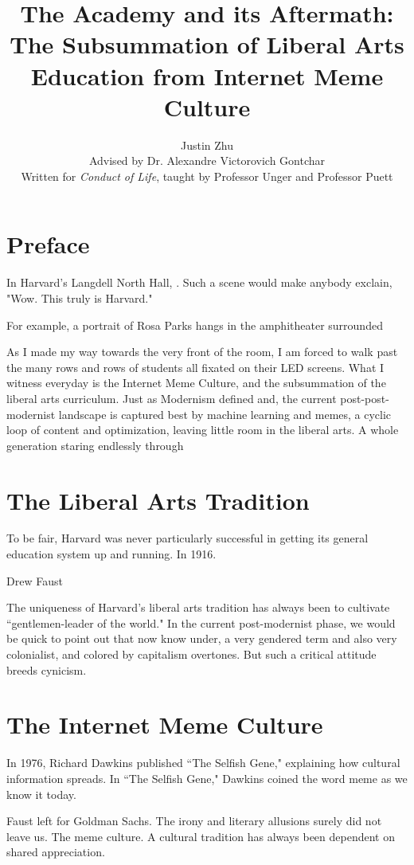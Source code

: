 \documentclass[12pt,letterpaper]{article}
\author{Justin Zhu \\ Advised by Dr. Alexandre Victorovich Gontchar \\ Written for \textit{Conduct of Life}, taught by Professor Unger and Professor Puett}
\title{The Academy and its Aftermath: The Subsummation of Liberal Arts Education from Internet Meme Culture}
\date{}
\begin{document}
\clearpage\maketitle
\thispagestyle{empty}
\pagebreak
\tableofcontents

\pagebreak

\pagestyle{plain}
\setcounter{page}{1}


\section{Preface}
In Harvard's Langdell North Hall, .  Such a scene would make anybody exclain, "Wow.  This truly is Harvard."

For example, a portrait of Rosa Parks hangs in the amphitheater surrounded 

As I made my way towards the very front of the room, I am forced to walk past the many rows and rows of students all fixated on their LED screens.  What I witness everyday is the Internet Meme Culture, and the subsummation of the liberal arts curriculum.  Just as Modernism defined and, the current post-post-modernist landscape is captured best by machine learning and memes, a cyclic loop of content and optimization, leaving little room in the liberal arts.  A whole generation staring endlessly through 

\section{The Liberal Arts Tradition}
To be fair, Harvard was never particularly successful in getting its general education system up and running.  In 1916.

Drew Faust

The uniqueness of Harvard's liberal arts tradition has always been to cultivate ``gentlemen-leader of the world."  In the current post-modernist phase, we would be quick to point out that now know under, a very gendered term and also very colonialist, and colored by capitalism overtones.  But such a critical attitude breeds cynicism.

\section{The Internet Meme Culture}
In 1976, Richard Dawkins published ``The Selfish Gene," explaining how cultural information spreads.  In ``The Selfish Gene," Dawkins coined the word meme as we know it today.

Faust left for Goldman Sachs.  The irony and literary allusions surely did not leave us.  The meme culture.  A cultural tradition has always been dependent on shared appreciation.
\end{document}
